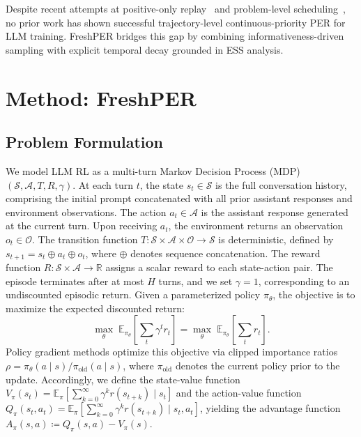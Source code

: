 \documentclass[runningheads]{llncs}
\newcommand{\method}{FreshPER}
\begin{document}
Despite recent attempts at positive-only replay~\cite{zhang2025rlep} and problem-level scheduling~\cite{fatemi2026prioritized}, no prior work has shown successful trajectory-level continuous-priority PER for LLM training. \method{} bridges this gap by combining informativeness-driven sampling with explicit temporal decay grounded in ESS analysis.



\section{Method: \method{}}
\label{sec:method}

\subsection{Problem Formulation}
\label{sec:formulation}
We model LLM RL as a multi-turn Markov Decision Process (MDP) $(\mathcal{S}, \mathcal{A}, T, R, \gamma)$. At each turn $t$, the state $s_t \in \mathcal{S}$ is the full conversation history, comprising the initial prompt concatenated with all prior assistant responses and environment observations. The action $a_t \in \mathcal{A}$ is the assistant response generated at the current turn. Upon receiving $a_t$, the environment returns an observation $o_t \in \mathcal{O}$. The transition function $T: \mathcal{S} \times \mathcal{A} \times \mathcal{O} \rightarrow \mathcal{S}$ is deterministic, defined by $s_{t+1} = s_t \oplus a_t \oplus o_t$, where $\oplus$ denotes sequence concatenation. The reward function $R: \mathcal{S} \times \mathcal{A} \rightarrow \mathbb{R}$ assigns a scalar reward to each state-action pair. The episode terminates after at most $H$ turns, and we set $\gamma = 1$, corresponding to an undiscounted episodic return.
Given a parameterized policy $\pi_\theta$, the objective is to maximize the expected discounted return:
\begin{equation}
    \max_\theta \; \mathbb{E}_{ \pi_\theta} \!\left[ \sum_t \gamma^tr_t \right] = \max_\theta \; \mathbb{E}_{ \pi_\theta} \!\left[ \sum_t r_t \right].
    \label{eq:objective}
\end{equation}
Policy gradient methods optimize this objective via clipped importance ratios $\rho = \pi_\theta(a \mid s) / \pi_{\mathrm{old}}(a \mid s)$, where $\pi_{\mathrm{old}}$ denotes the
current policy prior to the update. Accordingly, we define the state-value function $V_\pi(s_t) = \mathbb{E}_\pi[\sum_{k=0}^\infty \gamma^k r(s_{t+k}) \mid s_t]$ and the action-value function $Q_\pi(s_t, a_t)= \mathbb{E}_\pi[\sum_{k=0}^\infty \gamma^k r(s_{t+k}) \mid s_t,a_t]$, yielding the advantage function $A_\pi(s, a) \coloneqq Q_\pi(s, a) - V_\pi(s)$. 
\end{document}
